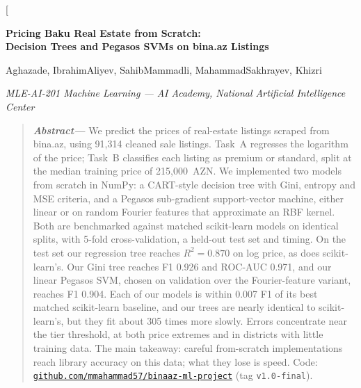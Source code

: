 \documentclass[10pt,twocolumn,a4paper]{article}
\newcommand{\abstractkw}[1]{\noindent\textbf{\textit{#1}}}
\begin{document}
\twocolumn[
  \begin{@twocolumnfalse}
  \begin{center}
    {\LARGE\bfseries Pricing Baku Real Estate from Scratch:\\Decision Trees and Pegasos SVMs on bina.az Listings\par}
    \vspace{1.2em}
    {\large
      Aghazade, Ibrahim\quad Aliyev, Sahib\quad Mammadli, Mahammad\quad Sakhrayev, Khizri\par}
    \vspace{0.5em}
    {\itshape MLE-AI-201 Machine Learning --- AI Academy, National Artificial Intelligence Center\par}
    \vspace{1.4em}
  \end{center}
  \begin{quote}
    \small
    \abstractkw{Abstract---}%
    We predict the prices of real-estate listings scraped from bina.az, using
    91{,}314 cleaned sale listings. %
    Task~A regresses the logarithm of the price; Task~B classifies each
    listing as premium or standard, split at the median training price of
    215{,}000~AZN. %
    We implemented two models from scratch in NumPy: a CART-style decision
    tree with Gini, entropy and MSE criteria, and a Pegasos sub-gradient
    support-vector machine, either linear or on random Fourier features that
    approximate an RBF kernel. Both are benchmarked against matched
    scikit-learn models on identical splits, with 5-fold cross-validation, a
    held-out test set and timing. On the test set our regression tree
    reaches $R^2 = 0.870$ on log price, %
    as does scikit-learn's. %
    Our Gini tree reaches F1 0.926 and ROC-AUC 0.971, %
    and our linear Pegasos SVM, chosen on validation over the Fourier-feature
    variant, reaches F1 0.904. %
    Each of our models is within 0.007 F1 of its best matched scikit-learn %
    baseline, and our trees are nearly identical to scikit-learn's, but they
    fit about 305 times more slowly. %
    Errors concentrate near the tier threshold, at both price extremes and
    in districts with little training data. The main takeaway: careful
    from-scratch implementations reach library accuracy on this data; what
    they lose is speed. Code:
    \href{https://github.com/mmahammad57/binaaz-ml-project}{\texttt{github.com/mmahammad57/binaaz-ml-project}}
    (tag \texttt{v1.0-final}).


\end{quote}
\end{@twocolumnfalse}
\end{document}
